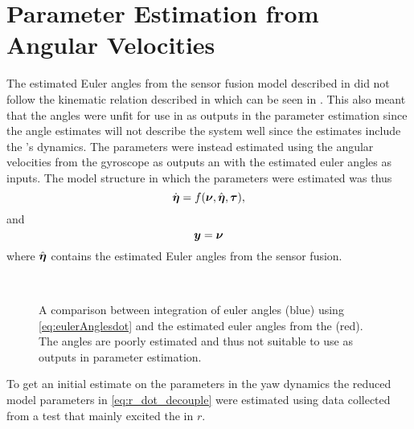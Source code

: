 \section{Parameter Estimation from Angular Velocities} \label{sec:estimation_angular}
The estimated Euler angles from the sensor fusion model described in  did not follow the kinematic relation described in  which can be seen in . This also meant that the angles were unfit for use in as outputs in the parameter estimation since the angle estimates will not describe the system well since the estimates include the \abbrEKF's dynamics. The parameters were instead estimated using the angular velocities from the gyroscope as outputs an with the estimated euler angles as inputs. The model structure in which the parameters were estimated was thus 
\begin{equation}
\dot{\boldsymbol{\eta}} = f(\boldsymbol{\nu}, \hat{\boldsymbol{\eta}}, \boldsymbol{\tau}),
\end{equation}
and
\begin{equation}
\boldsymbol{y} = \boldsymbol{\nu}
\end{equation}
where $\hat{\boldsymbol{\eta}}$ contains the estimated Euler angles from the sensor fusion.

\begin{figure}[tbp]
  \centering
  \qquad
  \\
  \caption{\label{fig:integratedAngleVelocities}%
  A comparison between integration of euler angles (blue) using \eqref{eq:eulerAnglesdot} and the estimated euler angles from the \abbrEKF (red). The angles are poorly estimated and thus not suitable to use as outputs in parameter estimation.}
\end{figure}

To get an initial estimate on the parameters in the yaw dynamics the reduced model parameters in \eqref{eq:r_dot_decouple}
were estimated using data collected from a test that mainly excited the \abbrROV in $r$.


